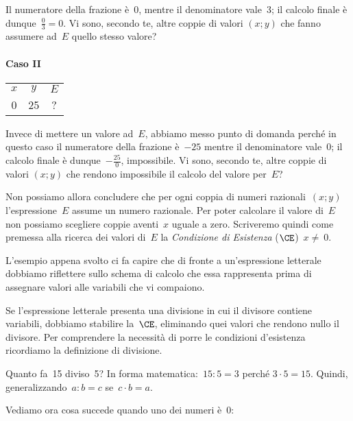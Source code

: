 Il numeratore della frazione è~0, mentre il denominatore vale~3; il
calcolo finale è dunque~$\frac{0}{3}=0$.
Vi sono, secondo te, altre coppie di valori $(x;y)$ che fanno
assumere ad~$E$ quello stesso valore?

\paragraph{Caso II}
\begin{center}
\begin{tabular*}{.2\textwidth}{@{\extracolsep{\fill}}*{3}{c}}
\toprule
$x$ &$y$ &$E$\\
0 &25 &?\\
\bottomrule
\end{tabular*}
\end{center}

Invece di mettere un valore ad~$E$, abbiamo messo punto di domanda
perché in questo caso il numeratore della frazione è~$-25$ mentre
il denominatore vale~0; il calcolo finale è dunque~$-{\frac{25}{0}}$, impossibile.
Vi sono, secondo te, altre coppie di valori $(x;y)$ che rendono
impossibile il calcolo del valore per~$E$?

Non possiamo allora concludere che per ogni coppia di numeri razionali~$(x;y)$ 
l'espressione~$E$ assume un numero razionale.
Per poter calcolare il valore di~$E$ non possiamo scegliere coppie aventi~$x$ 
uguale a zero.
Scriveremo quindi come premessa alla ricerca dei valori di~$E$ la \emph{Condizione di Esistenza} ($\CE$)~$x\neq~0$.

L'esempio appena svolto ci fa capire che di fronte a
un'espressione letterale dobbiamo riflettere sullo
schema di calcolo che essa rappresenta prima di assegnare valori alle
variabili che vi compaiono.

Se l'espressione letterale presenta una divisione in cui
il divisore contiene variabili, dobbiamo stabilire la~$\CE$, 
eliminando quei valori che rendono nullo il divisore.
Per comprendere la necessità di porre le condizioni
d'esistenza ricordiamo la definizione di divisione.

Quanto fa~15 diviso~5? In forma matematica:~$15:5=3$ perché $3\cdot 5=15$. Quindi, 
generalizzando~$a:b=c$ se~$c\cdot b=a$.

Vediamo ora cosa succede quando uno dei numeri è~0:

